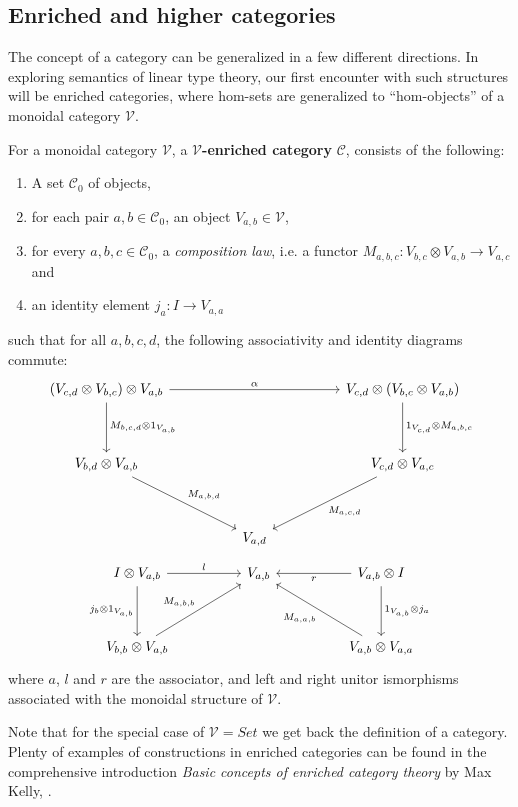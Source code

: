 
\subsection{Enriched and higher categories}
The concept of a category can be generalized in a few different directions. In exploring semantics of linear type theory, our first encounter with such structures will be  enriched categories, where hom-sets are generalized to ``hom-objects'' of a monoidal category $\mathcal{V}$.
\begin{defn}\label{enr-cat}
  For a monoidal category $\mathcal{V}$, a \textbf{$\mathcal{V}$-enriched category} $\mathcal{C}$, consists of the following:
  \begin{enumerate}
  \item A set $\mathcal{C}_0$ of objects,
  \item for each pair $a, b \in \mathcal{C}_0$, an object $V_{a,b} \in \mathcal{V}$,
  \item for every $a, b, c \in \mathcal{C}_0$, a \textit{composition law}, i.e. a functor $M_{a, b, c} : V_{b, c} \otimes V_{a, b} \to V_{a, c}$ and
  \item an identity element $j_a : I \to V_{a, a}$
\end{enumerate}
such that for all $a, b, c, d$, the following associativity and identity diagrams commute:
    \[
      \ti
      (V_{c, d} \otimes V_{b, c}) \otimes V_{a, b} \ar[d, "{M_{b, c, d} \otimes 1_{V_{a,b}}}"] \ar[rr, "\alpha"] & & V_{c, d} \otimes (V_{b, c} \otimes V_{a, b}) \ar[d, "{1_{V_{c,d}} \otimes M_{a, b, c}}"]\\
      V_{b, d} \otimes V_{a, b} \ar[rd, "M_{a, b, d}"] & & V_{c, d} \otimes V_{a, c} \ar[ld, "M_{a, c, d}"]\\
      & V_{a, d}      &
      \kz
    \]
    \[
      \ti
      I \otimes V_{a, b} \ar[d, "j_b \otimes 1_{V_{a, b}}", swap] \ar[r, "l"] & V_{a, b} & V_{a, b} \otimes I \ar[l, "r"] \ar[d, "1_{V_{a, b}} \otimes j_a"] \\
      V_{b, b} \otimes V_{a, b} \ar[ru, "M_{a, b, b}"] & & V_{a, b} \otimes V_{a, a} \ar[lu, "M_{a, a, b}"]
      \kz
    \]
    where $a$, $l$ and $r$ are the associator, and left and right unitor ismorphisms associated with the monoidal structure of $\mathcal{V}$.
\end{defn}
Note that for the special case of $\mathcal{V} = Set$ we get back the definition of a category. Plenty of examples of constructions in enriched categories can be found in the comprehensive introduction \textit{Basic concepts of enriched category theory} by Max Kelly, \cite{kelly}.\\
